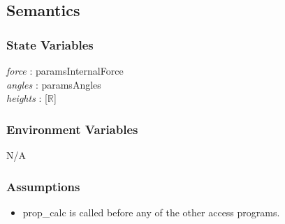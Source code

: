 \documentclass[12pt, titlepage]{article}
\begin{document}
\subsection{Semantics}

\subsubsection{State Variables}
\textit{force} : paramsInternalForce\\
\textit{angles} : paramsAngles\\
\textit{heights} : [$\mathbb{R}$]\\

\subsubsection{Environment Variables}
N/A

\subsubsection{Assumptions}
\begin{itemize}
	\item prop\_calc is called before any of the other access programs.
\end{itemize}
\end{document}
